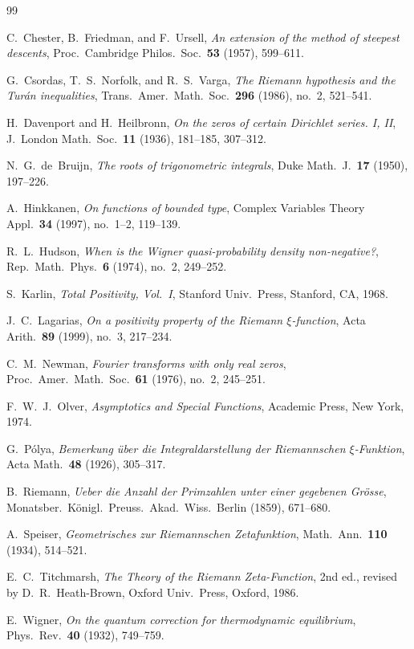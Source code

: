 \documentclass[11pt,a4paper,reqno]{amsart}
\theoremstyle{definition}
\theoremstyle{remark}
\numberwithin{equation}{section}
\begin{document}
\begin{thebibliography}{99}

C.~Chester, B.~Friedman, and F.~Ursell,
\emph{An extension of the method of steepest descents},
Proc.\ Cambridge Philos.\ Soc.\ \textbf{53} (1957), 599--611.

G.~Csordas, T.~S.~Norfolk, and R.~S.~Varga,
\emph{The Riemann hypothesis and the Tur\'an inequalities},
Trans.\ Amer.\ Math.\ Soc.\ \textbf{296} (1986), no.~2, 521--541.

H.~Davenport and H.~Heilbronn,
\emph{On the zeros of certain Dirichlet series. I, II},
J.\ London Math.\ Soc.\ \textbf{11} (1936), 181--185, 307--312.

N.~G.~de~Bruijn,
\emph{The roots of trigonometric integrals},
Duke Math.\ J.\ \textbf{17} (1950), 197--226.

A.~Hinkkanen,
\emph{On functions of bounded type},
Complex Variables Theory Appl.\ \textbf{34} (1997), no.~1--2, 119--139.

R.~L.~Hudson,
\emph{When is the Wigner quasi-probability density non-negative?},
Rep.\ Math.\ Phys.\ \textbf{6} (1974), no.~2, 249--252.

S.~Karlin,
\emph{Total Positivity, Vol.~I},
Stanford Univ.\ Press, Stanford, CA, 1968.

J.~C.~Lagarias,
\emph{On a positivity property of the Riemann $\xi$-function},
Acta Arith.\ \textbf{89} (1999), no.~3, 217--234.

C.~M.~Newman,
\emph{Fourier transforms with only real zeros},
Proc.\ Amer.\ Math.\ Soc.\ \textbf{61} (1976), no.~2, 245--251.

F.~W.~J.~Olver,
\emph{Asymptotics and Special Functions},
Academic Press, New York, 1974.

G.~P\'olya,
\emph{Bemerkung \"uber die Integraldarstellung der Riemannschen $\xi$-Funktion},
Acta Math.\ \textbf{48} (1926), 305--317.

B.~Riemann,
\emph{Ueber die Anzahl der Primzahlen unter einer gegebenen Gr\"osse},
Monatsber.\ K\"onigl.\ Preuss.\ Akad.\ Wiss.\ Berlin (1859), 671--680.

A.~Speiser,
\emph{Geometrisches zur Riemannschen Zetafunktion},
Math.\ Ann.\ \textbf{110} (1934), 514--521.

E.~C.~Titchmarsh,
\emph{The Theory of the Riemann Zeta-Function},
2nd ed., revised by D.~R.~Heath-Brown, Oxford Univ.\ Press, Oxford, 1986.

E.~Wigner,
\emph{On the quantum correction for thermodynamic equilibrium},
Phys.\ Rev.\ \textbf{40} (1932), 749--759.

\end{thebibliography}
\end{document}

